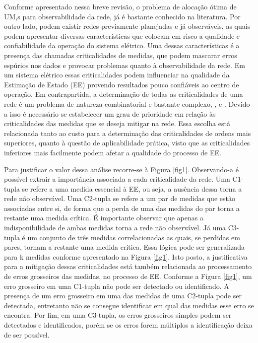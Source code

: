 \documentclass[12pt]{article}
\begin{document}
Conforme apresentado nessa breve revisão, o problema de alocação ótima de UM,s para observabilidade da rede, já é bastante conhecido na literatura. Por outro lado, podem existir redes previamente planejadas e já observáveis,  as quais podem apresentar diversas características que colocam em risco a qualidade e confiabilidade da operação do sistema elétrico. Uma dessas características é a presença das chamadas criticalidades de medidas, que podem mascarar erros espúrios nos dados e provocar problemas quanto à observabilidade da rede. Em um sistema elétrico essas criticalidades podem influenciar na qualidade da Estimação de Estado (EE) provendo resultados pouco confiáveis ao centro de operação. Em contrapartida, a determinação de todas as criticalidades de uma rede é um problema de natureza combinatorial e bastante complexo, \cite{AbelTese16},\cite{Sou12} e \cite{BB16}. Devido a isso é necessário se estabelecer um grau de prioridade em relação às criticalidades das medidas que se deseja mitigar na rede. Essa escolha está relacionada tanto ao custo para a determinação das criticalidades de ordens mais superiores, quanto à questão de aplicabilidade prática, visto que as criticalidades inferiores mais facilmente podem afetar a qualidade do processo de EE.

Para justificar o valor dessa análise recorre-se à Figura \ref{fig1}. Observando-a é possível extrair a importância associada a cada criticalidade da rede. Uma C1-tupla se refere a uma medida essencial à EE, ou seja, a ausência dessa torna a rede não observável. Uma C2-tupla se refere a um par de medidas que estão associadas entre si, de forma que a perda de uma das medidas do par torna a restante uma medida crítica. É importante observar que apenas a indisponibilidade de ambas medidas torna a rede não observável. Já uma C3-tupla é um conjunto de três medidas correlacionadas as quais, se perdidas em pares, tornam a restante uma medida crítica. Essa lógica pode ser generalizada para k medidas conforme apresentado na Figura \ref{fig1}. Isto posto, a justificativa para a mitigação dessas criticalidades está também relacionada ao processamento de erros grosseiros das medidas, no processo de EE. Conforme a Figura \ref{fig1}, um erro grosseiro em uma C1-tupla não pode ser detectado ou identificado. A presença de um erro grosseiro em uma das medidas de uma C2-tupla pode ser detectada, entretanto não se consegue identificar em qual das medidas esse erro se encontra. Por fim, em uma C3-tupla, os erros grosseiros simples podem ser detectados e identificados, porém se os erros forem múltiplos a identificação deixa de ser possível. 
\end{document}
